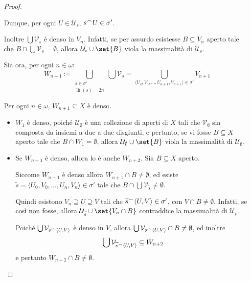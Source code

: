 \documentclass[titlepage]{article}
\newcommand{\1}{\mathds{1}}
\renewcommand{\tilde}[1]{\widetilde{#1}}
\newcommand{\concat}{\null^{\frown}} %
\theoremstyle{definition}%
\theoremstyle{plain}
\theoremstyle{remark}
\begin{document}
\begin{proof}
\begin{itemize}
Dunque, per ogni \(U \in \mathcal{U}_{s}\), \(s\concat U \in \sigma'\).

Inoltre \(\bigcup \mathcal{V}_{s}\) è denso in \(V_{n}\). Infatti, se per assurdo esistesse \(B \subseteq V_{n}\) aperto tale che \(B\cap \bigcup \mathcal{V}_{s} = \emptyset\), allora \(\mathcal{U}_{s}\cup \set{B}\) viola la massimalità di \(\mathcal{U}_{s}\).
\end{itemize}

Sia ora, per ogni \(n \in\omega\):
\begin{equation*}
W_{n+1} \coloneqq \bigcup_{\substack{s \in \sigma'\\
\operatorname{lh}(s) = 2n}} \bigcup \mathcal{V}_{s} = \bigcup_{\langle U_{0},V_{0},\dots, U_{n+1}, V_{n+1}\rangle \in \sigma'} V_{n+1}
\end{equation*}

Per ogni \(n \in \omega\), \(W_{n+1} \subseteq X\) è denso.
\begin{itemize}
\item \(W_{1}\) è denso, poiché \(\mathcal{U}_{\emptyset}\) è una collezione di aperti di \(X\) tali che \(\mathcal{V}_{\emptyset}\) sia composta da insiemi a due a due disgiunti, e pertanto, se vi fosse \(B \subseteq X\) aperto tale che \(B\cap W_{1} = \emptyset\), allora \(\mathcal{U}_{\emptyset}\cup\set{B}\) viola la massimalità di \(\mathcal{U}_{\emptyset}\).
\item Se \(W_{n+1}\) è denso, allora lo è anche \(W_{n+2}\). Sia \(B \subseteq X\) aperto.

Siccome \(W_{n+1}\) è denso allora \(W_{n+1}\cap B\neq \emptyset\), ed esiste \(\tilde{s} = \langle U_{0},V_{0},\dots,U_{n}, V_{n}\rangle \in \sigma'\) tale che \(B\cap\bigcup \mathcal{V}_{\tilde{s}} \neq \emptyset\).

Quindi esistono \(V_{n}\supseteq U \supseteq V\) tali che \(\tilde{s}\concat \langle U, V\rangle \in \sigma'\), con \(V\cap B\neq \emptyset\). Infatti, se così non fosse, allora \(\mathcal{U}_{\tilde{s}}\cup\set{V_{n}\cap B}\) contraddice la massimalità di \(\mathcal{U}_{\tilde{s}}\).

Poiché \(\bigcup \mathcal{V}_{s\concat \langle U, V\rangle}\) è denso in \(V\), allora \(\bigcup \mathcal{V}_{s\concat \langle U, V\rangle} \cap B \neq \emptyset\), ed inoltre
\begin{equation*}
  \bigcup \mathcal{V}_{\tilde{s}\concat \langle U, V\rangle} \subseteq W_{n+2}
\end{equation*}
e pertanto \(W_{n+2}\cap B\neq \emptyset\).
\end{itemize}


\end{proof}
\end{document}
